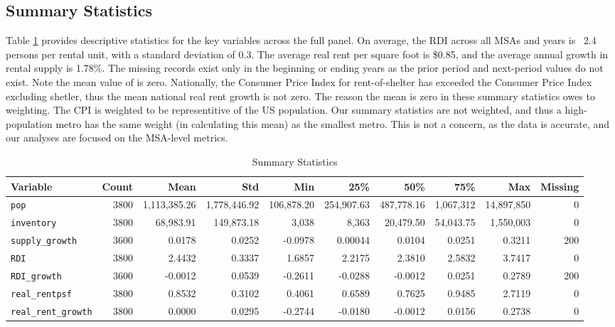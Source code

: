 \documentclass[APA,Times1COL]{WileyNJDv5} %
\begin{document}
\subsection{Summary Statistics}
Table \ref{tab:summary_stats} provides descriptive statistics for the key variables across the full panel. On average, the RDI across all MSAs and years is ~2.4 persons per rental unit, with a standard deviation of 0.3. The average real rent per square foot is \$0.85, and the average annual growth in rental supply is 1.78\%. The missing records exist only in the beginning or ending years as the prior period and next-period values do not exist. Note the mean value of  is zero. Nationally, the Consumer Price Index for rent-of-shelter has exceeded the Consumer Price Index excluding shetler, thus the mean national real rent growth is not zero. The reason the mean is zero in these summary statistics owes to weighting. The CPI is weighted to be representitive of the US population. Our summary statistics are not weighted, and thus a high-population metro has the same weight (in calculating this mean) as the smallest metro. This is not a concern, as the data is accurate, and our analyses are focused on the MSA-level metrics. 

\begin{table}[hbt!]
\centering
\caption{Summary Statistics}
\label{tab:summary_stats}
\begin{tabular}{lrrrrrrrrr}
	\toprule
	\textbf{Variable} & \textbf{Count} & \textbf{Mean} & \textbf{Std} & \textbf{Min} & \textbf{25\%} & \textbf{50\%} & \textbf{75\%} & \textbf{Max} & \textbf{Missing} \\
	\midrule
	\texttt{pop} & 3800 & 1,113,385.26 & 1,778,446.92 & 106,878.20 & 254,907.63 & 487,778.16 & 1,067,312 & 14,897,850 & 0 \\
	\texttt{inventory} & 3800 & 68,983.91 & 149,873.18 & 3,038 & 8,363 & 20,479.50 & 54,043.75 & 1,550,003 & 0 \\
	\texttt{supply\_growth} & 3600 & 0.0178 & 0.0252 & -0.0978 & 0.00044 & 0.0104 & 0.0251 & 0.3211 & 200 \\
	\texttt{RDI} & 3800 & 2.4432 & 0.3337 & 1.6857 & 2.2175 & 2.3810 & 2.5832 & 3.7417 & 0 \\
	\texttt{RDI\_growth} & 3600 & -0.0012 & 0.0539 & -0.2611 & -0.0288 & -0.0012 & 0.0251 & 0.2789 & 200 \\
	\texttt{real\_rentpsf} & 3800 & 0.8532 & 0.3102 & 0.4061 & 0.6589 & 0.7625 & 0.9485 & 2.7119 & 0 \\
	\texttt{real\_rent\_growth} & 3800 & 0.0000 & 0.0295 & -0.2744 & -0.0180 & -0.0012 & 0.0156 & 0.2738 & 0 \\
	\bottomrule
\end{tabular}
\end{table}
\end{document}
